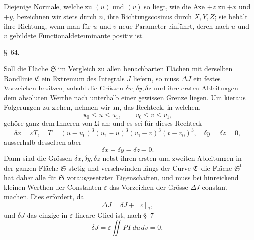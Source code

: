 \documentclass[11pt,a4paper,leqno]{article}
\begin{document}
Diejenige Normale, welche zu $(u)$ und $(v)$ so liegt, wie die
Axe $+z$ zu $+x$ und $+y$, bezeichnen wir stets durch $n$, ihre
Richtungscosinus durch $X,Y,Z$; sie behält ihre Richtung, wenn
man für $u$ und $v$ neue Parameter einführt, deren nach $u$ und $v$
gebildete Functionaldeterminante positiv ist.


\begin{center}
{\large \S~64.}
\end{center}

Soll die Fläche $\mathfrak{S}$ im Vergleich zu allen benachbarten
Flächen mit derselben Randlinie $\mathfrak{C}$ ein Extremum des Integrals
$J$ liefern, so muss $\Delta J$ ein festes Vorzeichen besitzen, sobald die
Grössen $\delta x,\delta y,\delta z$ und ihre ersten Ableitungen dem absoluten
Werthe nach unterhalb einer gewissen Grenze liegen. Um hieraus
Folgerungen zu ziehen, nehmen wir an, das Rechteck, in welchem
\begin{equation}\tag{7}
u_0\leq u\leq u_1,\qquad v_0\leq v\leq v_1,
\end{equation}
gehöre ganz dem Inneren von $\mathfrak{U}$ an; und es sei für dieses Rechteck
\[
\delta x=\varepsilon T,\quad
T=(u-u_0)^3(u_1-u)^3(v_1-v)^3(v-v_0)^3,
\quad \delta y=\delta z=0,
\]
ausserhalb desselben aber
\[
\delta x=\delta y=\delta z=0.
\]
Dann sind die Grössen $\delta x,\delta y,\delta z$ nebst ihren ersten und zweiten
Ableitungen in der ganzen Fläche $\mathfrak{S}$ stetig und verschwinden
längs der Curve $\mathfrak{C}$; die Fläche $\mathfrak{S}^0$ hat daher alle für $\mathfrak{S}$ vorausgesetzten Eigenschaften, und muss bei hinreichend kleinen Werthen
der Constanten $\varepsilon$ das Vorzeichen der Grösse $\Delta J$ constant machen.
Dies erfordert, da
\[
\Delta J=\delta J+[\varepsilon]_2,
\]
und $\delta J$ das einzige in $\varepsilon$ lineare Glied ist, nach \S~7
\[
\delta J=\varepsilon\iint PT\,du\,dv=0,
\]
\end{document}

